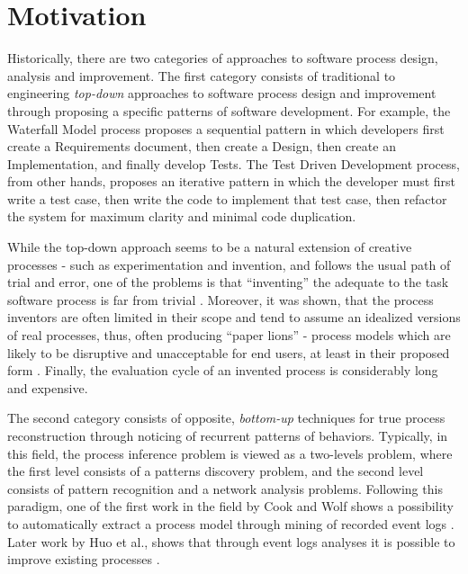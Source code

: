 \section{Motivation}
Historically, there are two categories of approaches to software process design, analysis and improvement. 
The first category consists of traditional to engineering \textit{top-down} approaches to software process 
design and improvement through proposing a specific patterns of software development. 
For example, the Waterfall Model process proposes a sequential pattern in which developers first create a 
Requirements document, then create a Design, then create an Implementation, and finally develop Tests. 
The Test Driven Development process, from other hands, proposes an iterative pattern in which
the developer must first write a test case, then write the code to implement that test case, then refactor the 
system for maximum clarity and minimal code duplication. 

While the top-down approach seems to be a natural extension of creative processes - such as experimentation
and invention, and follows the usual path of trial and error, one of the problems is that ``inventing'' the adequate 
to the task software process is far from trivial \cite{citeulike:5043104} \cite{citeulike:1986013}. 
Moreover, it was shown, that the process inventors are often limited in their scope and tend to assume an idealized
versions of real processes, thus, often producing ``paper lions'' - process models which are likely to be disruptive 
and unacceptable for end users, at least in their proposed form \cite{citeulike:9758924}. 
Finally, the evaluation cycle of an invented process is considerably long and expensive. 

The second category consists of opposite, \textit{bottom-up} techniques for true process reconstruction 
through noticing of recurrent patterns of behaviors. Typically, in this field, the process inference problem is viewed 
as a two-levels problem, where the first level consists of a patterns discovery problem, and the 
second level consists of pattern recognition and a network analysis problems.
Following this paradigm, one of the first work in the field by Cook and Wolf
shows a possibility to automatically extract a process model through mining of recorded event logs
\cite{citeulike:328044} \cite{citeulike:5120757} \cite{citeulike:5128143}. 
Later work by Huo et al., shows that through event logs analyses it is possible to improve existing 
processes \cite{citeulike:7691059} \cite{citeulike:7690766}. 

